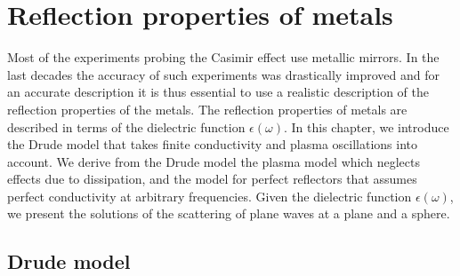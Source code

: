 \chapter{Reflection properties of metals}

Most of the experiments probing the Casimir effect use metallic mirrors. In the
last decades the accuracy of such experiments was drastically improved and for
an accurate description it is thus essential to use a realistic description of
the reflection properties of the metals. The reflection properties of metals
are described in terms of the dielectric function $\epsilon(\omega)$. In this
chapter, we introduce the Drude model that takes finite conductivity and plasma
oscillations into account. We derive from the Drude model the plasma model
which neglects effects due to dissipation, and the model for perfect reflectors
that assumes perfect conductivity at arbitrary frequencies. Given the
dielectric function $\epsilon(\omega)$, we present the solutions of the
scattering of plane waves at a plane and a sphere.

\section{Drude model}

